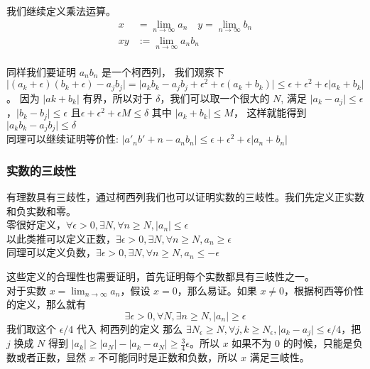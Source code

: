 我们继续定义乘法运算。 \\
\begin{align*} 
x & = \lim_{n \to \infty}a_n \quad y  = \lim_{n \to \infty} b_n \\
xy & := \lim_{n \to \infty} a_nb_n 
\end{align*} \\

同样我们要证明 $a_nb_n$ 是一个柯西列， 我们观察下 $\lvert (a_k + \epsilon)(b_k + \epsilon ) - a_jb_j \rvert = \lvert a_kb_k - a_jb_j + \epsilon^2 + \epsilon(a_k + b_k) \rvert \le \epsilon + \epsilon^2 + \epsilon \lvert a_k + b_k\rvert$。
因为 $\lvert ak+b_k \rvert$ 有界，所以对于 $\delta$，我们可以取一个很大的 $N$, 满足 $\lvert a_k - a_j \rvert \le \epsilon $，$ \lvert b_k - b_j \rvert \le \epsilon $ 且$\epsilon + \epsilon^2 + \epsilon M \le \delta $ 其中 $\lvert a_k + b_k\rvert \le M$，
这样就能得到 $\lvert a_kb_k - a_jb_j\rvert \le \delta $ \\

同理可以继续证明等价性: $\lvert a'_nb'+n - a_nb_n\rvert \le \epsilon + \epsilon^2 + \epsilon \lvert a_n + b_n \rvert$

\subsubsection{实数的三歧性}
有理数具有三歧性，通过柯西列我们也可以证明实数的三岐性。我们先定义正实数和负实数和零。\\
零很好定义，$\forall \epsilon >0, \exists N, \forall n \ge N, \lvert a_n \rvert \le \epsilon$ \\
以此类推可以定义正数，$\exists \epsilon > 0, \exists N, \forall n \ge N, a_n \ge \epsilon $ \\
同理可以定义负数，$\exists \epsilon > 0, \exists N, \forall n \ge N, a_n \le -\epsilon $

这些定义的合理性也需要证明，首先证明每个实数都具有三岐性之一。\\
对于实数 $x = \lim_{n\to \infty} a_n$，假设 $x = 0$，那么易证。如果 $x \ne 0$，根据柯西等价性的定义，那么就有 
\[ \exists \epsilon > 0, \forall N , \exists n \ge N, \lvert a_n \rvert \ge \epsilon \]
我们取这个 $\epsilon / 4 $ 代入 柯西列的定义 那么 $\exists N_{\epsilon} \ge N , \forall j,k \ge N_{\epsilon}, \lvert a_k - a_j\rvert \le \epsilon / 4 $，把 $j$ 换成 $N$ 得到 
$\lvert a_k  \rvert \ge  \lvert a_N \rvert - \lvert a_k - a_N \rvert \ge \frac{3}{4} \epsilon $。所以 $x$ 如果不为 0 的时候，只能是负数或者正数，显然 $x$ 不可能同时是正数和负数，所以 $x$ 满足三岐性。

